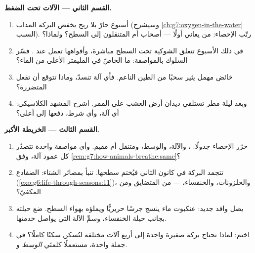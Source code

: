 \begin{problem}
\medskip\noindent\textbf{القسم الثاني --- الآلات تحت
الضغط.}
\begin{enumerate}[resume]
  \item أسبوع حارّ بلا ريح يخفض  البركة المذاب
        (وسيشرح \cref{ch:g7:oxygen-in-the-water} السبب). رتّب
        الإحصاء: من يعاني أولًا --- أصحاب  أم المتنقلون
        إلى السطح؟ ولماذا؟
  \item في ذلك الأسبوع تتعلق  الشوكية تحت السطح مباشرة،
        وأفواهها تعمل عند . فسّر السلوك بالمواصفة: ما
        الخاصّ في المليمتر الأعلى من الماء؟
  \item خائض مهمل يثير سحبًا من الطين الناعم. فأي آلة تنسدّ،
        وماذا تتوقع أن تفعل  المتضررة؟
  \item وبعد ليلة مطر تستلقي ديدان أرض العشب على الممر. اشرح
        المشهد الكلاسيكي: أي آلة، وأي شرط، دفعها إلى أعلى؟
\end{enumerate}

\medskip\noindent\textbf{القسم الثالث --- الخريطة الأكبر.}
\begin{enumerate}[resume]
  \item حرّر الإحصاء جدولًا: ، والآلة، والوسط، ومتنقل أم
        مقيم. وأي مواصفة واحدة تتصدّر كل عمود آلة، وفق
        \cref{rem:g7:how-animals-breathe:same}؟
  \item تتجمد البركة في كانون الثاني فيُختم سطحها. تنبأ بمصائر
        الشتاء: الضفادع
        (\cref{exo:g6:life-through-seasons:11})، والحلزونات،
        والخنفساء،  --- من المتضايق ومن المكفيّ؟
  \item يصل وافد جديد: عنكبوت ماء ينسج جرسًا حريريًّا ويملؤه بهواء
        السطح. ضع حيلته بجانب حيلة الخنفساء، وسمِّ الآلة التي
        يواصل خدمتها.
  \item اختم: لماذا تحتاج بركة صغيرة واحدة إلى أربع آلات 
        مختلفة لتُسكن سكنًا كاملًا؟ في جملة واحدة، مستعملًا كلمتَي
        \emph{الوسط} و\emph{}.
\end{enumerate}
\end{problem}
